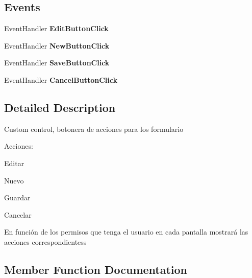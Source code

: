 \subsection*{Events}
\begin{DoxyCompactItemize}
\item 
\mbox{\label{class_custom_controls_1_1_stack_view_a63d3aaa67d3d681a55e44abfdc1e18a8}} 
Event\+Handler {\bfseries Edit\+Button\+Click}
\item 
\mbox{\label{class_custom_controls_1_1_stack_view_af19003ef6d5198e763c656b624c3fbbc}} 
Event\+Handler {\bfseries New\+Button\+Click}
\item 
\mbox{\label{class_custom_controls_1_1_stack_view_a6086b716160faebc479c3a407092a7d5}} 
Event\+Handler {\bfseries Save\+Button\+Click}
\item 
\mbox{\label{class_custom_controls_1_1_stack_view_a19d78699d1abcd1c49f4941b58f76800}} 
Event\+Handler {\bfseries Cancel\+Button\+Click}
\end{DoxyCompactItemize}


\subsection{Detailed Description}
Custom control, botonera de acciones para los formulario 

Acciones\+:
\begin{DoxyItemize}
\item Editar
\item Nuevo
\item Guardar
\item Cancelar
\end{DoxyItemize}

En función de los permisos que tenga el usuario en cada pantalla mostrará las acciones correspondientess 

\subsection{Member Function Documentation}
\mbox{\label{class_custom_controls_1_1_stack_view_a227a09aebaaa2cc577a4bfa50cb08967}} 
